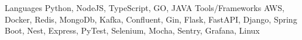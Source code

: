 \begin{cvskills}
  \cvskill
  {Languages}
  {Python, NodeJS, TypeScript, GO, JAVA}
  \cvskill
  {Tools/Frameworks}
  {AWS, Docker, Redis, MongoDb, Kafka, Confluent, Gin, Flask, FastAPI, Django, Spring Boot, Nest, Express, PyTest, Selenium, Mocha, Sentry, Grafana, Linux}
\end{cvskills}